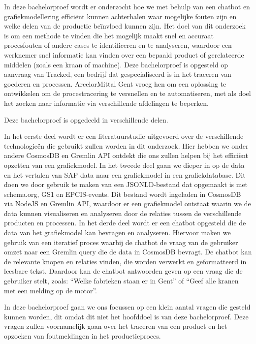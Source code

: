 In deze bachelorproef wordt er onderzocht hoe we met behulp van een chatbot en grafiekmodellering efficiënt kunnen achterhalen waar mogelijke fouten zijn en welke delen van de productie beïnvloed kunnen zijn.
Het doel van dit onderzoek is om een methode te vinden die het mogelijk maakt snel en accuraat procesfouten of andere cases te identificeren en te analyseren, waardoor een werknemer snel informatie kan vinden over een bepaald product of gerelateerde middelen (zoals een kraan of machine).
Deze bachelorproef is opgesteld op aanvraag van Tracked, een bedrijf dat gespecialiseerd is in het traceren van goederen en processen.
ArcelorMittal Gent vroeg hen om een oplossing te ontwikkelen om de procestracering te versnellen en te automatiseren, met als doel het zoeken naar informatie via verschillende afdelingen te beperken.

Deze bachelorproef is opgedeeld in verschillende delen.

In het eerste deel wordt er een literatuurstudie uitgevoerd over de verschillende technologieën die gebruikt zullen worden in dit onderzoek.
Hier hebben we onder andere CosmosDB en Gremlin API ontdekt die ons zullen helpen bij het efficiënt opzetten van een grafiekmodel.
In het tweede deel gaan we dieper in op de data en het vertalen van SAP data naar een grafiekmodel in een grafiekdatabase.
Dit doen we door gebruik te maken van een JSONLD-bestand dat opgemaakt is met schema.org, GS1 en EPCIS-events.
Dit bestand wordt ingeladen in CosmosDB via NodeJS en Gremlin API, waardoor er een grafiekmodel ontstaat waarin we de data kunnen visualiseren en analyseren door de relaties tussen de verschillende producten en processen.
In het derde deel wordt er een chatbot opgesteld die de data van het grafiekmodel kan bevragen en analyseren.
Hiervoor maken we gebruik van een iteratief proces waarbij de chatbot de vraag van de gebruiker omzet naar een Gremlin query die de data in CosmosDB bevragt.
De chatbot kan de relevante knopen en relaties vinden, die worden verwerkt en geformatteerd in leesbare tekst.
Daardoor kan de chatbot antwoorden geven op een vraag die de gebruiker stelt, zoals: ``Welke fabrieken staan er in Gent'' of ``Geef alle kranen met een melding op de motor''.

In deze bachelorproef gaan we ons focussen op een klein aantal vragen die gesteld kunnen worden, dit omdat dit niet het hoofddoel is van deze bachelorproef.
Deze vragen zullen voornamelijk gaan over het traceren van een product en het opzoeken van foutmeldingen in het productieproces.